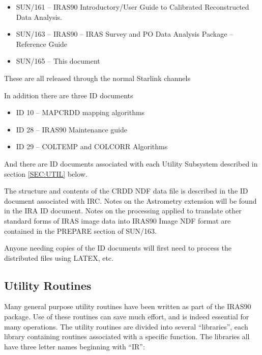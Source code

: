 \documentclass[twoside,11pt]{article}
\newcommand{\xref}[3]{#1}
\newcommand{\xlabel}[1]{}
\begin{document}
\begin{itemize}

\item \xref{SUN/161}{sun161}{} --
IRAS90 Introductory/User Guide to Calibrated Reconstructed Data Analysis.

\item \xref{SUN/163}{sun163}{} --
IRAS90 -- IRAS Survey and PO Data Analysis Package -- Reference Guide

\item \xref{SUN/165}{sun165}{} -- This document

\end{itemize}

These are all released through the normal Starlink channels

In addition there are three ID documents

\begin{itemize}

\item ID 10 -- MAPCRDD mapping algorithms

\item ID 28 -- IRAS90 Maintenance guide

\item ID 29 -- COLTEMP and COLCORR Algorithms

\end{itemize}

And there are ID documents associated with each Utility Subsystem described in
section \ref{SEC:UTIL} below.

The structure and contents of the CRDD NDF data file is described in the ID
document associated with IRC. Notes on the Astrometry extension will be found
in the IRA ID document. Notes on the processing applied to translate other
standard forms of IRAS image data into IRAS90 Image NDF format are contained
in the PREPARE section of \xref{SUN/163}{sun163}{}.

Anyone needing copies of the ID documents will first need to process the
distributed files using {\small LATEX}, etc.


\subsection{Utility Routines
\xlabel{utility_routines}\label{SEC:UTIL}}

Many general purpose utility routines have been written as part of the
{\small IRAS90} package. Use of these routines can save much effort,
and is indeed essential for many operations. The utility routines are
divided into several ``libraries'', each library containing routines
associated with a specific function. The libraries all have three
letter names beginning with ``IR'':
\end{document}
